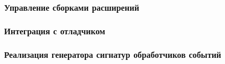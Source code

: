  
\subsubsection{Управление сборками расширений}
\label{sec:sd_dll}


\subsubsection{Интеграция с отладчиком}
\label{sec:sd_debug}


\subsubsection{Реализация генератора сигнатур обработчиков событий}
\label{sec:sd_ehsg}


\pagebreak
